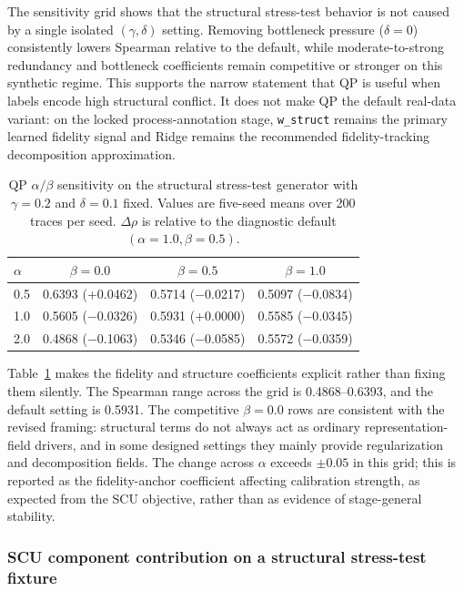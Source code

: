 \documentclass[a4paper,fleqn]{cas-sc}
\begin{document}
The sensitivity grid shows that the structural stress-test behavior is not caused by a single isolated $(\gamma,\delta)$ setting. Removing bottleneck pressure ($\delta=0$) consistently lowers Spearman relative to the default, while moderate-to-strong redundancy and bottleneck coefficients remain competitive or stronger on this synthetic regime. This supports the narrow statement that QP is useful when labels encode high structural conflict. It does not make QP the default real-data variant: on the locked process-annotation stage, \texttt{w\_struct} remains the primary learned fidelity signal and Ridge remains the recommended fidelity-tracking decomposition approximation.

\begin{table}[ht]
\caption{QP $\alpha/\beta$ sensitivity on the structural stress-test generator with $\gamma=0.2$ and $\delta=0.1$ fixed. Values are five-seed means over 200 traces per seed. $\Delta\rho$ is relative to the diagnostic default $(\alpha=1.0,\beta=0.5)$.}
\label{tab:supp-alpha-beta-sensitivity}
\centering
\small
\begin{tabular}{lccc}
\toprule
\textbf{$\alpha$} & \textbf{$\beta=0.0$} & \textbf{$\beta=0.5$} & \textbf{$\beta=1.0$} \\
\midrule
0.5 & 0.6393 (+0.0462) & 0.5714 ($-$0.0217) & 0.5097 ($-$0.0834) \\
1.0 & 0.5605 ($-$0.0326) & 0.5931 (+0.0000) & 0.5585 ($-$0.0345) \\
2.0 & 0.4868 ($-$0.1063) & 0.5346 ($-$0.0585) & 0.5572 ($-$0.0359) \\
\bottomrule
\end{tabular}
\end{table}

Table~\ref{tab:supp-alpha-beta-sensitivity} makes the fidelity and structure coefficients explicit rather than fixing them silently. The Spearman range across the grid is 0.4868--0.6393, and the default setting is 0.5931. The competitive $\beta=0.0$ rows are consistent with the revised framing: structural terms do not always act as ordinary representation-field drivers, and in some designed settings they mainly provide regularization and decomposition fields. The change across $\alpha$ exceeds $\pm 0.05$ in this grid; this is reported as the fidelity-anchor coefficient affecting calibration strength, as expected from the SCU objective, rather than as evidence of stage-general stability.

\subsubsection{SCU component contribution on a structural stress-test fixture}
\end{document}
